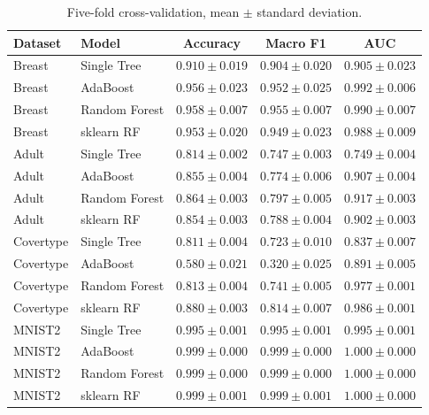 \documentclass[conference]{IEEEtran}
\begin{document}
\begin{table}[t]
\centering
\scriptsize
\caption{Five-fold cross-validation, mean $\pm$ standard deviation.}
\label{tab:h2h}
\begin{tabular}{llccc}
\toprule
Dataset & Model & Accuracy & Macro F1 & AUC \\
\midrule
Breast & Single Tree & $0.910\pm0.019$ & $0.904\pm0.020$ & $0.905\pm0.023$ \\
Breast & AdaBoost & $0.956\pm0.023$ & $0.952\pm0.025$ & $0.992\pm0.006$ \\
Breast & Random Forest & $0.958\pm0.007$ & $0.955\pm0.007$ & $0.990\pm0.007$ \\
Breast & sklearn RF & $0.953\pm0.020$ & $0.949\pm0.023$ & $0.988\pm0.009$ \\
Adult & Single Tree & $0.814\pm0.002$ & $0.747\pm0.003$ & $0.749\pm0.004$ \\
Adult & AdaBoost & $0.855\pm0.004$ & $0.774\pm0.006$ & $0.907\pm0.004$ \\
Adult & Random Forest & $0.864\pm0.003$ & $0.797\pm0.005$ & $0.917\pm0.003$ \\
Adult & sklearn RF & $0.854\pm0.003$ & $0.788\pm0.004$ & $0.902\pm0.003$ \\
Covertype & Single Tree & $0.811\pm0.004$ & $0.723\pm0.010$ & $0.837\pm0.007$ \\
Covertype & AdaBoost & $0.580\pm0.021$ & $0.320\pm0.025$ & $0.891\pm0.005$ \\
Covertype & Random Forest & $0.813\pm0.004$ & $0.741\pm0.005$ & $0.977\pm0.001$ \\
Covertype & sklearn RF & $0.880\pm0.003$ & $0.814\pm0.007$ & $0.986\pm0.001$ \\
MNIST2 & Single Tree & $0.995\pm0.001$ & $0.995\pm0.001$ & $0.995\pm0.001$ \\
MNIST2 & AdaBoost & $0.999\pm0.000$ & $0.999\pm0.000$ & $1.000\pm0.000$ \\
MNIST2 & Random Forest & $0.999\pm0.000$ & $0.999\pm0.000$ & $1.000\pm0.000$ \\
MNIST2 & sklearn RF & $0.999\pm0.001$ & $0.999\pm0.001$ & $1.000\pm0.000$ \\
\bottomrule
\end{tabular}
\end{table}
\end{document}
